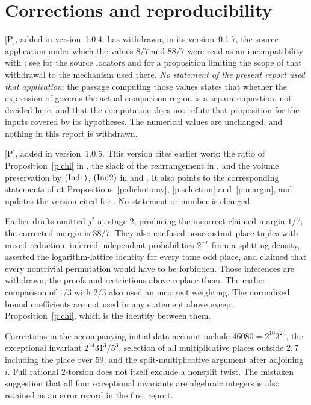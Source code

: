\documentclass[11pt]{article}
\theoremstyle{plain}
\theoremstyle{definition}
\newcommand{\Ind}[1]{\textup{(Ind#1)}}
\begin{document}
\section*{Corrections and reproducibility}

\textup{[P], added in version~1.0.4.}  \cite{First} has withdrawn, in its
version~0.1.7, the source application under which the values $8/7$ and $88/7$
were read as an incompatibility with \cite{IUT4}; see \cite[\S7]{First} for the
source locators and for a proposition limiting the scope of that withdrawal to
the mechanism used there.  \emph{No statement of the present report used that
application}: the passage computing those values states that whether the
expression of \cite[Prop.~1.4(iii)]{IUT4} governs the actual comparison region is
a separate question, not decided here, and that the computation does not refute
that proposition for the inputs covered by its hypotheses.  The numerical values
are unchanged, and nothing in this report is withdrawn.

\textup{[P], added in version~1.0.5.}  This version cites earlier work: the ratio of
Proposition~\ref{p:chi} in \cite{DHPS}, the slack of the rearrangement in
\cite{JoshiIV}, and the volume preservation by $\Ind1$, $\Ind2$ in \cite{TK} and
\cite{Mor}.  It also points to the corresponding statements of \cite{First} at
Propositions~\ref{p:dichotomy}, \ref{p:selection} and~\ref{p:margin}, and updates the
version cited for \cite{Firstfull}.  No statement or number is changed.


Earlier drafts omitted $j^2$ at stage $2$, producing the incorrect claimed
margin $1/7$; the corrected margin is $88/7$.  They also confused nonconstant
place tuples with mixed reduction, inferred independent probabilities
$2^{-r}$ from a splitting density, asserted the logarithm-lattice identity
for every tame odd place, and claimed that every nontrivial permutation
would have to be forbidden.  Those inferences are withdrawn; the proofs
and restrictions above replace them.  The earlier comparison of $1/3$
with $2/3$ also used an incorrect weighting.  The normalized bound
coefficients are not used in any statement above except
Proposition~\ref{p:chi}, which is the identity between them.

Corrections in the accompanying initial-data account include
$46080=2^{10}3^25$, the exceptional invariant $2^{14}31^3/5^3$,
selection of all multiplicative places outside $2,7$ including the place
over $59$, and the split-multiplicative argument after adjoining $i$.
Full rational $2$-torsion does not itself exclude a nonsplit twist.
The mistaken suggestion that all four exceptional invariants are algebraic
integers is also retained as an error record in the first report.
\end{document}
